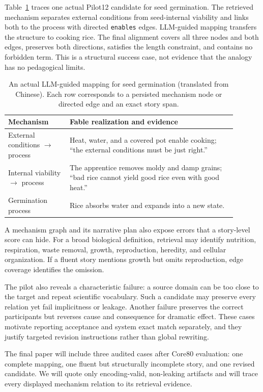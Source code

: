 \documentclass[letterpaper]{article} %
\begin{document}
Table~\ref{tab:case} traces one actual Pilot12 candidate for seed germination. The retrieved mechanism separates external conditions from seed-internal viability and links both to the process with directed \texttt{enables} edges. LLM-guided mapping transfers the structure to cooking rice. The final alignment covers all three nodes and both edges, preserves both directions, satisfies the length constraint, and contains no forbidden term. This is a structural success case, not evidence that the analogy has no pedagogical limits.

\begin{table}[t]
\centering
\small
\begin{tabular}{p{0.24\linewidth}p{0.65\linewidth}}
\toprule
Mechanism & Fable realization and evidence \\
\midrule
External conditions $\rightarrow$ process & Heat, water, and a covered pot enable cooking; ``the external conditions must be just right.'' \\
Internal viability $\rightarrow$ process & The apprentice removes moldy and damp grains; ``bad rice cannot yield good rice even with good heat.'' \\
Germination process & Rice absorbs water and expands into a new state. \\
\bottomrule
\end{tabular}
\caption{An actual LLM-guided mapping for seed germination (translated from Chinese). Each row corresponds to a persisted mechanism node or directed edge and an exact story span.}
\label{tab:case}
\end{table}

A mechanism graph and its narrative plan also expose errors that a story-level score can hide. For a broad biological definition, retrieval may identify nutrition, respiration, waste removal, growth, reproduction, heredity, and cellular organization. If a fluent story mentions growth but omits reproduction, edge coverage identifies the omission.

The pilot also reveals a characteristic failure: a source domain can be too close to the target and repeat scientific vocabulary. Such a candidate may preserve every relation yet fail implicitness or leakage. Another failure preserves the correct participants but reverses cause and consequence for dramatic effect. These cases motivate reporting acceptance and system exact match separately, and they justify targeted revision instructions rather than global rewriting.

The final paper will include three audited cases after Core80 evaluation: one complete mapping, one fluent but structurally incomplete story, and one revised candidate. We will quote only encoding-valid, non-leaking artifacts and will trace every displayed mechanism relation to its retrieval evidence.
\end{document}
